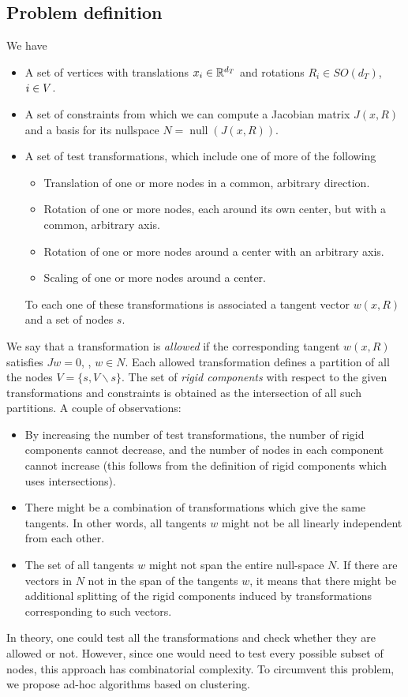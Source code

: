 \documentclass[12pt]{article}
\DeclareMathOperator{\nullspace}{null}
\begin{document}
\subsection{Problem definition}
We have
\begin{itemize}
\item A set of vertices with translations $x_i\in\mathbb{R}^{d_T}{}$ and rotations $R_i\in SO(d_T)$, ${i \in V}$.
\item A set of constraints from which we can compute a Jacobian matrix $J(x,R)$ and a basis for its nullspace $N=\nullspace(J(x,R))$.
\item A set of test transformations, which include one of more of the following
  \begin{itemize}
  \item Translation of one or more nodes in a common, arbitrary direction.
  \item Rotation of one or more nodes, each around its own center, but with a common, arbitrary axis.
  \item Rotation of one or more nodes around a center with an arbitrary axis.
  \item Scaling of one or more nodes around a center.
  \end{itemize}
  To each one of these transformations is associated a tangent vector $w(x,R)$ and a set of nodes $s$.
\end{itemize}
 We say that a transformation is \emph{allowed} if the corresponding tangent $w(x,R)$ satisfies $Jw=0$, \ie, $w\in N$. Each allowed transformation defines a partition of all the nodes $V=\{s,V\backslash s\}$. The set of \emph{rigid components} with respect to the given transformations and constraints is obtained as the intersection of all such partitions.
A couple of observations:
\begin{itemize}
\item By increasing the number of test transformations, the number of rigid components cannot decrease, and the number of nodes in each component cannot increase (this follows from the definition of rigid components which uses intersections).
\item There might be a combination of transformations which give the same tangents. In other words, all tangents $w$ might not be all linearly independent from each other.
\item The set of all tangents $w$ might not span the entire null-space $N$. If there are vectors in $N$ not in the span of the tangents $w$, it means that there might be additional splitting of the rigid components induced by transformations corresponding to such vectors.
\end{itemize}
In theory, one could test all the transformations and check whether they are allowed or not. However, since one would need to test every possible subset of nodes, this approach has combinatorial complexity. To circumvent this problem, we propose ad-hoc algorithms based on clustering.
\end{document}
